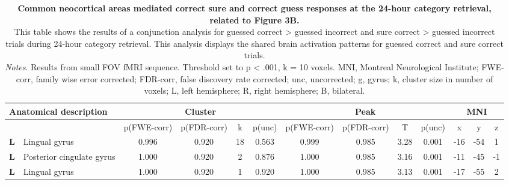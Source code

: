 \begin{landscape}
\begin{table}[!ht]
    \vspace*{-4cm}
    \raggedright
       \begin{tabular}{ll|cccc|cccc|ccc} \\ \hline
        \multicolumn{2}{l}{\textbf{Anatomical description}} & \multicolumn{4}{c}{\textbf{Cluster}} & \multicolumn{4}{c}{\textbf{Peak}} &  \multicolumn{3}{c}{\textbf{MNI}} \\ \hline
        \multicolumn{2}{l}{\textbf{}} & \multicolumn{1}{l}{p(FWE-corr)} & p(FDR-corr) & k & \multicolumn{1}{l}{p(unc)} & p(FWE-corr) & p(FDR-corr) & T & \multicolumn{1}{l}{p(unc)} & x & y & z \\ \hline
        \textbf{L} & Lingual gyrus & 0.996 & 0.920 & 18 & 0.563 & 0.999 & 0.985 & 3.28 & 0.001 & -16 & -54 & 1 \\
        \textbf{L} & Posterior cingulate gyrus& 1.000 & 0.920 & 2 & 0.876 & 1.000 & 0.985 & 3.16 & 0.001 & -11 & -45 & -1 \\
        \textbf{L} & Lingual gyrus & 1.000 & 0.920 & 1 & 0.920 & 1.000 & 0.985 & 3.13 & 0.001 & -17 & -55 & 2 \\ \hline
    \end{tabular}
    \vspace{1.0 em}
    \caption{\textbf{Common neocortical areas mediated correct sure and correct guess responses at the 24-hour category retrieval, related to Figure 3B.}\\
    This table shows the results of a conjunction analysis for guessed correct > guessed incorrect and sure correct > guessed incorrect trials during 24-hour category retrieval. 
    This analysis displays the shared brain activation patterns for guessed correct and sure correct trials. \\
    \vspace{1.0 em} \textit{Notes}. Results from small FOV fMRI sequence. Threshold set to p < .001, k = 10 voxels. MNI, Montreal Neurological Institute; FWE-corr, family wise error corrected; FDR-corr, false discovery rate corrected; unc, uncorrected; g, gyrus; k, cluster size in number of voxels; L, left hemisphere; R, right hemisphere; B, bilateral.}
\label{tab:Retrieval2_hipp_Conjunction_ConsciousUnconscious}
\end{table}
\end{landscape}


